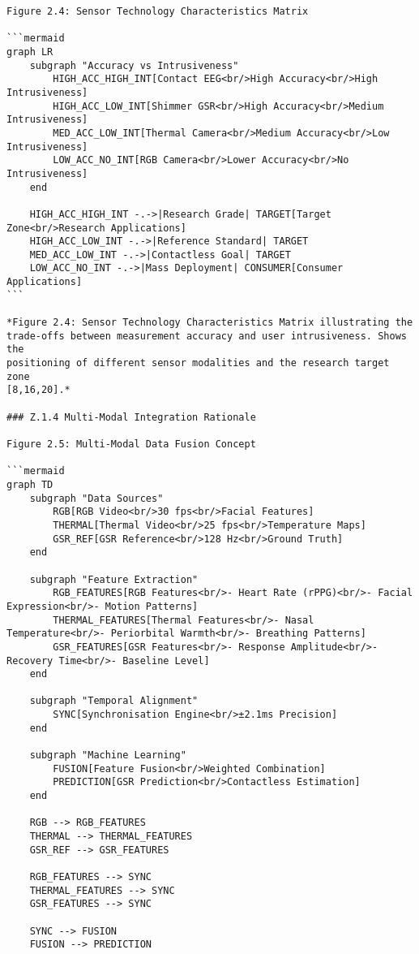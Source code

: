 \begin{verbatim}
Figure 2.4: Sensor Technology Characteristics Matrix

```mermaid
graph LR
    subgraph "Accuracy vs Intrusiveness"
        HIGH_ACC_HIGH_INT[Contact EEG<br/>High Accuracy<br/>High Intrusiveness]
        HIGH_ACC_LOW_INT[Shimmer GSR<br/>High Accuracy<br/>Medium Intrusiveness]
        MED_ACC_LOW_INT[Thermal Camera<br/>Medium Accuracy<br/>Low Intrusiveness]
        LOW_ACC_NO_INT[RGB Camera<br/>Lower Accuracy<br/>No Intrusiveness]
    end

    HIGH_ACC_HIGH_INT -.->|Research Grade| TARGET[Target Zone<br/>Research Applications]
    HIGH_ACC_LOW_INT -.->|Reference Standard| TARGET
    MED_ACC_LOW_INT -.->|Contactless Goal| TARGET
    LOW_ACC_NO_INT -.->|Mass Deployment| CONSUMER[Consumer Applications]
```

*Figure 2.4: Sensor Technology Characteristics Matrix illustrating the
trade-offs between measurement accuracy and user intrusiveness. Shows the
positioning of different sensor modalities and the research target zone
[8,16,20].*

### Z.1.4 Multi-Modal Integration Rationale

Figure 2.5: Multi-Modal Data Fusion Concept

```mermaid
graph TD
    subgraph "Data Sources"
        RGB[RGB Video<br/>30 fps<br/>Facial Features]
        THERMAL[Thermal Video<br/>25 fps<br/>Temperature Maps]
        GSR_REF[GSR Reference<br/>128 Hz<br/>Ground Truth]
    end

    subgraph "Feature Extraction"
        RGB_FEATURES[RGB Features<br/>- Heart Rate (rPPG)<br/>- Facial Expression<br/>- Motion Patterns]
        THERMAL_FEATURES[Thermal Features<br/>- Nasal Temperature<br/>- Periorbital Warmth<br/>- Breathing Patterns]
        GSR_FEATURES[GSR Features<br/>- Response Amplitude<br/>- Recovery Time<br/>- Baseline Level]
    end

    subgraph "Temporal Alignment"
        SYNC[Synchronisation Engine<br/>±2.1ms Precision]
    end

    subgraph "Machine Learning"
        FUSION[Feature Fusion<br/>Weighted Combination]
        PREDICTION[GSR Prediction<br/>Contactless Estimation]
    end

    RGB --> RGB_FEATURES
    THERMAL --> THERMAL_FEATURES
    GSR_REF --> GSR_FEATURES

    RGB_FEATURES --> SYNC
    THERMAL_FEATURES --> SYNC
    GSR_FEATURES --> SYNC

    SYNC --> FUSION
    FUSION --> PREDICTION


\end{verbatim}
